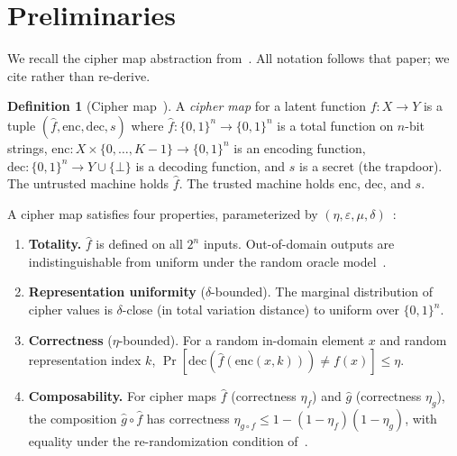 \documentclass[11pt]{article}
\theoremstyle{definition}
\newtheorem{definition}{Definition}[section]
\theoremstyle{plain}
\theoremstyle{remark}
\newcommand{\enc}{\mathrm{enc}}
\newcommand{\dec}{\mathrm{dec}}
\newcommand{\fhat}{\hat{f}}
\newcommand{\B}{\{0,1\}}
\begin{document}
\section{Preliminaries}
\label{sec:prelim}

We recall the cipher map abstraction from~\cite{towell2026cipher}.
All notation follows that paper; we cite rather than re-derive.

\begin{definition}[Cipher map~{\cite[Def.~3.1]{towell2026cipher}}]
\label{def:cipher-map}
A \emph{cipher map} for a latent function $f : X \to Y$ is a tuple
$(\fhat, \enc, \dec, s)$ where
$\fhat : \B^n \to \B^n$ is a total function on $n$-bit strings,
$\enc : X \times \{0,\ldots,K{-}1\} \to \B^n$ is an encoding function,
$\dec : \B^n \to Y \cup \{\bot\}$ is a decoding function, and
$s$ is a secret (the trapdoor).
The untrusted machine holds $\fhat$.
The trusted machine holds $\enc$, $\dec$, and $s$.
\end{definition}

A cipher map satisfies four properties, parameterized by
$(\eta, \varepsilon, \mu, \delta)$~\cite[Sec.~4]{towell2026cipher}:

\begin{enumerate}
\item \textbf{Totality.} $\fhat$ is defined on all $2^n$ inputs.
  Out-of-domain outputs are indistinguishable from uniform under the
  random oracle model~\cite{bellare1993random}.

\item \textbf{Representation uniformity} ($\delta$-bounded).
  The marginal distribution of cipher values is $\delta$-close (in total
  variation distance) to uniform over $\B^n$.

\item \textbf{Correctness} ($\eta$-bounded).
  For a random in-domain element $x$ and random representation index $k$,
  $\Pr[\dec(\fhat(\enc(x,k))) \neq f(x)] \leq \eta$.

\item \textbf{Composability.}
  For cipher maps $\fhat$ (correctness $\eta_f$) and $\hat{g}$ (correctness
  $\eta_g$), the composition $\hat{g} \circ \fhat$ has correctness
  $\eta_{g \circ f} \leq 1 - (1-\eta_f)(1-\eta_g)$, with equality under
  the re-randomization condition
  of~\cite[Thm.~4.2]{towell2026cipher}.
\end{enumerate}
\end{document}
